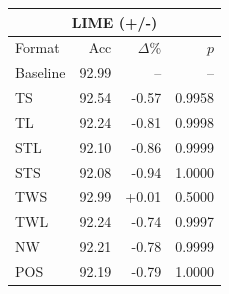 \begin{tabular}{lrrr}
\toprule
\multicolumn{4}{c}{\textbf{LIME (+/-)}} \\
\midrule
Format & Acc & $\Delta$\% & $p$ \\
\midrule
Baseline & 92.99 & -- & -- \\
\midrule
TS & 92.54 & -0.57 & 0.9958 \\
TL & 92.24 & -0.81 & 0.9998 \\
STL & 92.10 & -0.86 & 0.9999 \\
STS & 92.08 & -0.94 & 1.0000 \\
TWS & 92.99 & +0.01 & 0.5000 \\
TWL & 92.24 & -0.74 & 0.9997 \\
NW & 92.21 & -0.78 & 0.9999 \\
POS & 92.19 & -0.79 & 1.0000 \\
\bottomrule
\end{tabular}